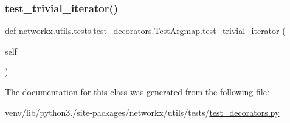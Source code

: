 \mbox{\label{classnetworkx_1_1utils_1_1tests_1_1test__decorators_1_1TestArgmap_ae5e25b80315e005da05ef3d3c91ec185}} 
\subsubsection{\texorpdfstring{test\+\_\+trivial\+\_\+iterator()}{test\_trivial\_iterator()}}
{\footnotesize\ttfamily def networkx.\+utils.\+tests.\+test\+\_\+decorators.\+Test\+Argmap.\+test\+\_\+trivial\+\_\+iterator (\begin{DoxyParamCaption}\item[{}]{self }\end{DoxyParamCaption})}



The documentation for this class was generated from the following file\+:\begin{DoxyCompactItemize}
\item 
venv/lib/python3./site-\/packages/networkx/utils/tests/\hyperlink{test__decorators_8py}{test\+\_\+decorators.\+py}\end{DoxyCompactItemize}
